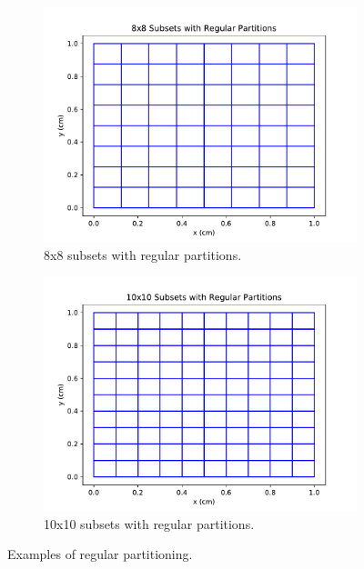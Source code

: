 \documentclass[times,final]{elsarticle}
\begin{document}
\begin{figure}[H]
\begin{subfigure}[b]{0.45\textwidth}
  \includegraphics[width=\textwidth]{../Dissertation/cut_line_files/8_regular.pdf}
  \caption{8x8 subsets with regular partitions.}
  \label{8regular}
\end{subfigure}
\begin{subfigure}[b]{0.45\textwidth}
  \includegraphics[width=\textwidth]{../Dissertation/cut_line_files/10_regular.pdf}
  \caption{10x10 subsets with regular partitions.}
  \label{10regular}
\end{subfigure}
\caption{Examples of regular partitioning.}
\label{regular_partitions}
\end{figure}
\end{document}

